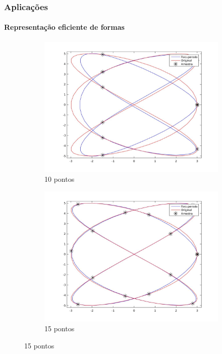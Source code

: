 \begin{frame}
\frametitle{{\bf \color{blue} Aplicações}}
\framesubtitle{\color{blue} Representação eficiente de formas}

\begin{figure}
	\centering
	\begin{subfigure}[b]{0.31\textwidth}
		\centering
		\includegraphics[trim={5cm 2cm 3cm 2cm},clip,width=\textwidth]{imagens/rep_2_10.jpg}
		\caption{10 pontos}
		\label{fig:ex24}
	\end{subfigure}
	\hfill
	\begin{subfigure}[b]{0.31\textwidth}
		\centering
		\includegraphics[trim={5cm 2cm 3cm 2cm},clip,width=\textwidth]{imagens/rep_2_15.jpg}
		\caption{15 pontos}

\end{subfigure}
\end{figure}
\end{frame}
